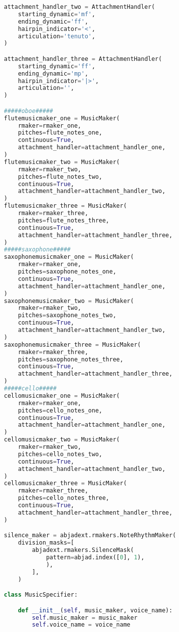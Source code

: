 \begin{lstlisting}[language=Python, caption=Four Ages of Sand Segment\_I]
attachment_handler_two = AttachmentHandler(
    starting_dynamic='mf',
    ending_dynamic='ff',
    hairpin_indicator='<',
    articulation='tenuto',
)

attachment_handler_three = AttachmentHandler(
    starting_dynamic='ff',
    ending_dynamic='mp',
    hairpin_indicator='|>',
    articulation='',
)

#####oboe#####
flutemusicmaker_one = MusicMaker(
    rmaker=rmaker_one,
    pitches=flute_notes_one,
    continuous=True,
    attachment_handler=attachment_handler_one,
)
flutemusicmaker_two = MusicMaker(
    rmaker=rmaker_two,
    pitches=flute_notes_two,
    continuous=True,
    attachment_handler=attachment_handler_two,
)
flutemusicmaker_three = MusicMaker(
    rmaker=rmaker_three,
    pitches=flute_notes_three,
    continuous=True,
    attachment_handler=attachment_handler_three,
)
#####saxophone#####
saxophonemusicmaker_one = MusicMaker(
    rmaker=rmaker_one,
    pitches=saxophone_notes_one,
    continuous=True,
    attachment_handler=attachment_handler_one,
)
saxophonemusicmaker_two = MusicMaker(
    rmaker=rmaker_two,
    pitches=saxophone_notes_two,
    continuous=True,
    attachment_handler=attachment_handler_two,
)
saxophonemusicmaker_three = MusicMaker(
    rmaker=rmaker_three,
    pitches=saxophone_notes_three,
    continuous=True,
    attachment_handler=attachment_handler_three,
)
#####cello#####
cellomusicmaker_one = MusicMaker(
    rmaker=rmaker_one,
    pitches=cello_notes_one,
    continuous=True,
    attachment_handler=attachment_handler_one,
)
cellomusicmaker_two = MusicMaker(
    rmaker=rmaker_two,
    pitches=cello_notes_two,
    continuous=True,
    attachment_handler=attachment_handler_two,
)
cellomusicmaker_three = MusicMaker(
    rmaker=rmaker_three,
    pitches=cello_notes_three,
    continuous=True,
    attachment_handler=attachment_handler_three,
)

silence_maker = abjadext.rmakers.NoteRhythmMaker(
    division_masks=[
        abjadext.rmakers.SilenceMask(
            pattern=abjad.index([0], 1),
            ),
        ],
    )

class MusicSpecifier:

    def __init__(self, music_maker, voice_name):
        self.music_maker = music_maker
        self.voice_name = voice_name



\end{lstlisting}
